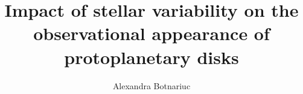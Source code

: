 \documentclass[12pt,twoside,bind,ams,a4paper]{hepthesis}
\title{Impact of stellar variability on the observational appearance of protoplanetary disks}
\author{Alexandra Botnariuc}
\begin{document}
\begin{frontmatter}

\end{frontmatter}

\begin{mainmatter}


\end{mainmatter}

\begin{appendices}
\end{appendices}

\begin{backmatter}


\end{backmatter}
\end{document}
